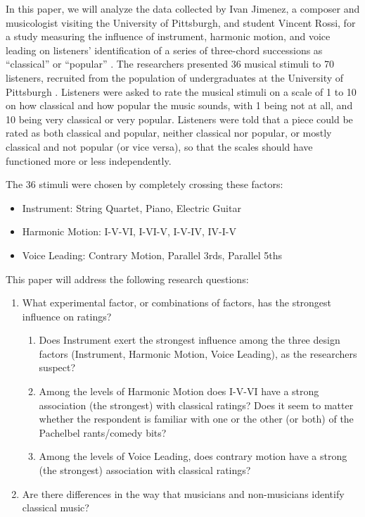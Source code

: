 \documentclass{article}
\begin{document}
\bigbreak

In this paper, we will analyze the data collected by Ivan Jimenez, a composer and musicologist visiting the University of Pittsburgh, and student Vincent Rossi, for a study measuring the influence of instrument, harmonic motion, and voice leading on listeners' identification of a series of three-chord successions as ``classical'' or ``popular'' \parencite{Jimenez-presentation}. The researchers presented 36 musical stimuli to 70 listeners, recruited from the population of undergraduates at the University of Pittsburgh \parencite{homework-9}. Listeners were asked to rate the musical stimuli on a scale of 1 to 10 on how classical and how popular the music sounds, with 1 being not at all, and 10 being very classical or very popular. Listeners were told that a piece could be rated as both classical and popular, neither classical nor popular, or mostly classical and not popular (or vice versa), so that the scales should have functioned more or less independently.

\bigbreak

The 36 stimuli were chosen by completely crossing these factors:
\begin{itemize}
    \item Instrument: String Quartet, Piano, Electric Guitar
    \item Harmonic Motion: I-V-VI, I-VI-V, I-V-IV, IV-I-V
    \item Voice Leading: Contrary Motion, Parallel 3rds, Parallel 5ths
\end{itemize}

This paper will address the following research questions:

\begin{enumerate}
    \item What experimental factor, or combinations of factors, has the strongest influence on ratings?
    \begin{enumerate}
        \item Does Instrument exert the strongest influence among the three design factors (Instrument, Harmonic Motion, Voice Leading), as the researchers suspect?
        \item Among the levels of Harmonic Motion does I-V-VI have a strong association (the strongest) with classical ratings? Does it seem to matter whether the respondent is familiar with one or the other (or both) of the Pachelbel rants/comedy bits?
        \item Among the levels of Voice Leading, does contrary motion have a strong (the strongest) association with classical ratings?
    \end{enumerate}
    \item Are there differences in the way that musicians and non-musicians identify classical music?
\end{enumerate}
\end{document}
